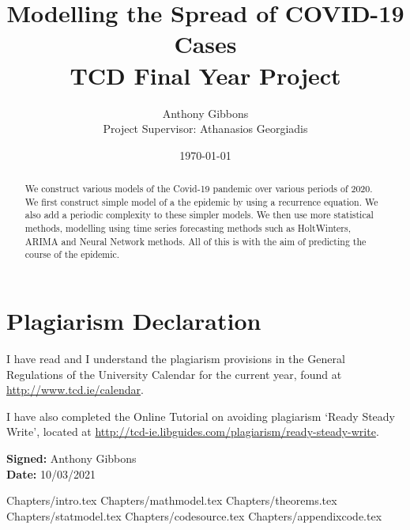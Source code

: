 \documentclass[a4paper]{article}
\title{Modelling the Spread of COVID-19 Cases \\ \large{TCD Final Year Project}}
\author{Anthony Gibbons \\  \normalsize{Project Supervisor: Athanasios Georgiadis}}
\date{\today}
\begin{document}
\maketitle      
\renewcommand\lstlistlistingname{List of Code}

\begin{abstract}
    We construct various models of the Covid-19 pandemic over various periods of 2020. We first construct simple model of a the epidemic by using a recurrence equation. We also add a periodic complexity to these simpler models. We then use more statistical methods, modelling using time series forecasting methods such as HoltWinters, ARIMA and Neural Network methods. All of this is with the aim of predicting the course of the epidemic.
\end{abstract}
\pagebreak
\section*{Plagiarism Declaration}
I have read and I understand the plagiarism provisions in the General
Regulations of the University Calendar for the current year, found at
\url{http://www.tcd.ie/calendar}.

I have also completed the Online Tutorial on avoiding plagiarism
‘Ready Steady Write’, located at
\url{http://tcd-ie.libguides.com/plagiarism/ready-steady-write}.

\textbf{Signed:} Anthony Gibbons \\
\textbf{Date:} 10/03/2021
\pagebreak

\hypersetup{
    linkcolor=black,
}

\tableofcontents \pagebreak

\listoffigures \pagebreak

\lstlistoflistings \pagebreak

{Chapters/intro.tex}
\pagebreak
{Chapters/mathmodel.tex}
\pagebreak
{Chapters/theorems.tex}
\pagebreak
{Chapters/statmodel.tex}
\pagebreak
{Chapters/codesource.tex}
\pagebreak 
{Chapters/appendixcode.tex}
\pagebreak 
\printbibliography
\end{document}
